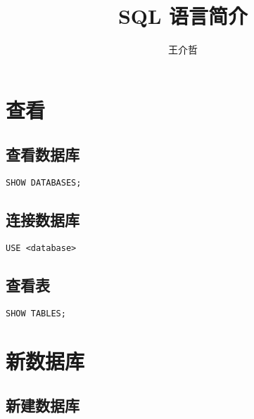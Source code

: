 \documentclass[a4paper, twoside]{article}
\begin{document}
\titleformat{\section}{\centering\Large\bfseries}{\thesection\,}{1em}{}

\title{\Huge{SQL 语言简介}}
\author{王介哲}

\maketitle
{}
\tableofcontents
\clearpage

\pagestyle{fancy}

\section{查看}

\subsection{查看数据库}

\begin{verbatim}
SHOW DATABASES;
\end{verbatim}

\subsection{连接数据库}

\begin{verbatim}
USE <database>
\end{verbatim}

\subsection{查看表}

\begin{verbatim}
SHOW TABLES;
\end{verbatim}

\section{新数据库}

\subsection{新建数据库}
\end{document}
